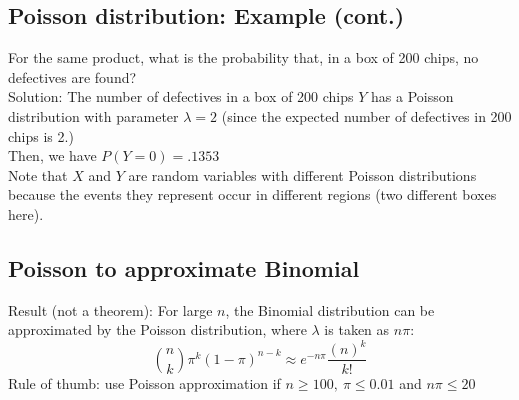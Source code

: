 \documentclass[
  letterpaper,
  DIV=11,
  numbers=noendperiod]{scrartcl}
\begin{document}
\subsection{Poisson distribution: Example
(cont.)}\label{poisson-distribution-example-cont.}

{For the same product, what is the probability that, in a box of 200
chips, no defectives are found?}\\
{Solution:} The number of defectives in a box of 200 chips \(Y\) has a
Poisson distribution with parameter \(\lambda=2\) (since the expected
number of defectives in 200 chips is 2.)\\
Then, we have \(P(Y=0)= .1353\)\\
Note that \(X\) and \(Y\) are random variables with different Poisson
distributions because the events they represent occur in different
regions (two different boxes here).\\

\subsection{Poisson to approximate
Binomial}\label{poisson-to-approximate-binomial}

{Result (not a theorem):} For large \(n\), the Binomial distribution can
be approximated by the Poisson distribution, where \(\lambda\) is taken
as \(n\pi\):
\[{n \choose k} \pi^{k}(1-\pi)^{n-k} \approx e^{-n\pi}\frac{(n)^{k}}{k!}\]
{Rule of thumb:} use Poisson approximation if
\(n \ge 100,\ \pi \le 0.01\) and \(n\pi \leq 20\)\\
\end{document}
